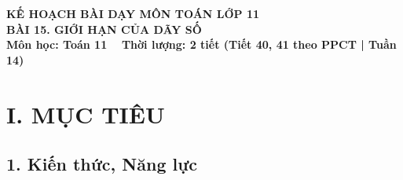 \documentclass[12pt, a4paper]{article}
\begin{document}
\begin{center}
    {\fontsize{14pt}{17pt}\selectfont \textbf{KẾ HOẠCH BÀI DẠY MÔN TOÁN LỚP 11}}\\[6pt]
    {\fontsize{16pt}{19pt}\selectfont \textbf{BÀI 15. GIỚI HẠN CỦA DÃY SỐ}}\\[4pt]
    {\fontsize{12pt}{15pt}\selectfont \textbf{Môn học: Toán 11} \ \textbar \ \textbf{Thời lượng: 2 tiết (Tiết 40, 41 theo PPCT | Tuần 14)}}
\end{center}

\vspace{5pt}

\section*{I. MỤC TIÊU}

\subsection*{1. Kiến thức, Năng lực}
\end{document}
